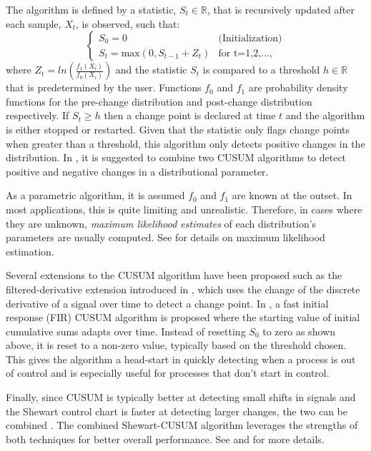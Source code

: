 The algorithm is defined by a statistic, $S_t \in \mathbb{R}$, that is recursively updated after each sample, $X_t$, is observed, such that:
\begin{equation}
  \begin{cases}
    S_0 = 0  & \text{(Initialization)} \\
    S_t = \text{max}(0, S_{t-1} + Z_t) & \text{for t=1,2,...,}
  \end{cases}
\end{equation}
where $Z_t=ln(\frac{f_{1}(X_i)}{f_{0}(X_i)})$ and the statistic $S_t$ is compared to a threshold $h \in \mathbb{R}$ that is predetermined by the user. Functions $f_0$ and $f_1$ are probability density functions for the pre-change distribution and post-change distribution respectively.  If $S_t \geq h$ then a change point is declared at time $t$ and the algorithm is either stopped or restarted. Given that the statistic only flags change points when greater than a threshold, this algorithm only detects positive changes in the distribution. In \cite{page1954continuous}, it is suggested to combine two CUSUM algorithms to detect positive and negative changes in a distributional parameter.

As a parametric algorithm, it is assumed $f_0$ and $f_1$ are known at the outset. In most applications, this is quite limiting and unrealistic. Therefore, in cases where they are unknown, \textit{maximum likelihood estimates} of each distribution's parameters are usually computed. See \cite{kay1993fundamentals} for details on maximum likelihood estimation. 

Several extensions to the CUSUM algorithm have been proposed such as the filtered-derivative extension introduced in \cite{basseville1981edge}, which uses the change of the discrete derivative of a signal over time to detect a change point. In \cite{lucas1982fast}, a fast initial response (FIR) CUSUM algorithm is proposed where the starting value of initial cumulative sums adapts over time. Instead of resetting $S_0$ to zero as shown above, it is reset to a non-zero value, typically based on the threshold chosen. This gives the algorithm a head-start in quickly detecting when a process is out of control and is especially useful for processes that don't start in control.

Finally, since CUSUM is typically better at detecting small shifts in signals and the Shewart control chart is faster at detecting larger changes, the two can be combined \cite{lucas1982combined}. The combined Shewart-CUSUM algorithm leverages the strengths of both techniques for better overall performance. See  \cite{yashchin1985analysis} and \cite{westgard1977combined} for more details. 

